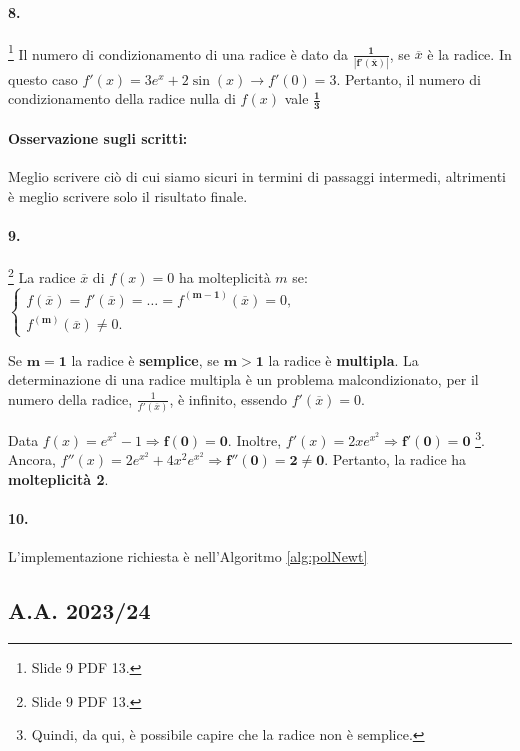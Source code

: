 \paragraph{8.}\footnote{Slide 9 PDF 13.} Il numero di condizionamento di una radice è dato da $\boldsymbol{\frac{1}{|f'(\overline{x})|}}$, se $\overline{x}$ è la radice. In questo caso $f'(x)=3e^x+2\sin{(x)}\rightarrow f'(0)=3$. Pertanto, il numero di condizionamento della radice nulla di $f(x)$ vale $\boldsymbol{\frac{1}{3}}$

\paragraph{Osservazione sugli scritti:} Meglio scrivere ciò di cui siamo sicuri in termini di passaggi intermedi, altrimenti è meglio scrivere solo il risultato finale.

\paragraph{9.}\footnote{Slide 9 PDF 13.} La radice $\overline{x}$ di $f(x)=0$ ha molteplicità $m$ se:
$\begin{cases}
	f(\overline{x})=f'(\overline{x})=\hdots=f^{(\boldsymbol{m-1})}(\overline{x})=0,\\
	f^{(\boldsymbol m)}(\overline{x})\neq 0.
\end{cases}$

\noindent Se $\boldsymbol{m=1}$ la radice è \textbf{semplice}, se $\boldsymbol{m>1}$ la radice è \textbf{multipla}. La determinazione di una radice multipla è un problema malcondizionato, per il numero della radice, $\frac{1}{f'(\overline{x})}$, è infinito, essendo $f'(\overline{x})=0$. 

\noindent Data $f(x)=e^{x^2}-1\Rightarrow\boldsymbol{f(0)=0}$. Inoltre, $f'(x)=2xe^{x^2}\Rightarrow\boldsymbol{f'(0)=0}$ \footnote{Quindi, da qui, è possibile capire che la radice non è semplice.}. Ancora, $f''(x)=2e^{x^2}+4x^2e^{x^2}\Rightarrow\boldsymbol{f''(0)=2\neq 0}.$ Pertanto, la radice ha \textbf{molteplicità 2}.

\paragraph{10.} L'implementazione richiesta è nell'Algoritmo \ref{alg:polNewt}

\subsection{A.A. 2023/24}
